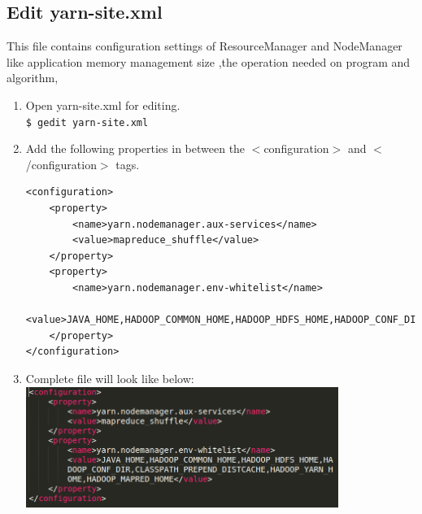 \documentclass[12pt]{article}%
\begin{document}
\subsection{Edit yarn-site.xml}
This file contains configuration
settings of ResourceManager and NodeManager like application
memory management size ,the operation needed on program and
algorithm,
\begin{enumerate}
\item Open yarn-site.xml for editing.\\
\lstinline{$ gedit yarn-site.xml}
\item Add the following properties in between the $<$configuration$>$ and $<$/configuration$>$ tags.\\
\begin{lstlisting}
<configuration>
    <property>
        <name>yarn.nodemanager.aux-services</name>
        <value>mapreduce_shuffle</value>
    </property>
    <property>
        <name>yarn.nodemanager.env-whitelist</name>
        <value>JAVA_HOME,HADOOP_COMMON_HOME,HADOOP_HDFS_HOME,HADOOP_CONF_DIR,CLASSPATH_PREPEND_DISTCACHE,HADOOP_YARN_HOME,HADOOP_MAPRED_HOME</value>
    </property>
</configuration>
\end{lstlisting}
\item Complete file will look like below:\\
\includegraphics[width=0.8\textwidth]{yarnxml.png}
\end{enumerate}
\end{document}
